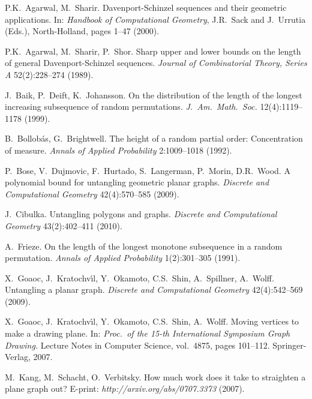 \documentclass[reqno,12pt]{amsart}
\begin{document}
\begin{thebibliography}{10}

P.K.~Agarwal, M.~Sharir.
\newblock
Davenport-Schinzel sequences and their geometric applications.
\newblock
In: {\it Handbook of Computational Geometry}, 
J.R.~Sack and J.~Urrutia (Eds.), North-Holland, pages 1--47 (2000).

P.K.~Agarwal, M.~Sharir, P.~Shor. 
\newblock
Sharp upper and lower bounds on the length of general Davenport-Schinzel 
sequences. 
\newblock
{\em Journal of Combinatorial Theory, Series A} 
52(2):228--274 (1989).

J.~Baik, P.~Deift, K.~Johansson.
\newblock
On the distribution of the length of the longest increasing subsequence 
of random permutations.
\newblock
{\em J.\ Am.\ Math.\ Soc.} 12(4):1119--1178 (1999). 

B.~Bollob\'as, G.~Brightwell. 
\newblock
The height of a random partial order: Concentration of measure.
\newblock
{\em Annals of Applied Probability\/} 2:1009--1018 (1992).

P.~Bose, V.~Dujmovic, F.~Hurtado, S.~Langerman, P.~Morin, D.R.~Wood.
\newblock
A polynomial bound for untangling geometric planar graphs. 
\newblock
{\em Discrete and Computational Geometry} 42(4):570--585 (2009).


J.~Cibulka.
\newblock
Untangling polygons and graphs.
\newblock
{\em Discrete and Computational Geometry} 43(2):402--411 (2010).


A.~Frieze.
\newblock
On the length of the longest monotone subsequence in a random permutation.
\newblock
{\em Annals of Applied Probability\/} 1(2):301--305 (1991).

X.~Goaoc, J.~Kratochv\'{\i}l, Y.~Okamoto, C.S.~Shin, A.~Spillner, A.~Wolff.
\newblock
Untangling a planar graph.
\newblock
{\it Discrete and Computational Geometry\/} 42(4):542--569 (2009).

X.~Goaoc, J.~Kratochv\'{\i}l, Y.~Okamoto, C.S.~Shin, A.~Wolff.
\newblock
Moving vertices to make a drawing plane. 
\newblock
In: 
{\it Proc.\ of the 15-th International Symposium Graph Drawing.}
Lecture Notes in Computer Science, vol.\ 4875, pages 101--112. 
Springer-Verlag, 2007. 


M.~Kang, M.~Schacht, O.~Verbitsky.
\newblock
How much work does it take to straighten a plane graph out?
\newblock
E-print: {\sl http://arxiv.org/abs/0707.3373} (2007).


\end{thebibliography}
\end{document}
